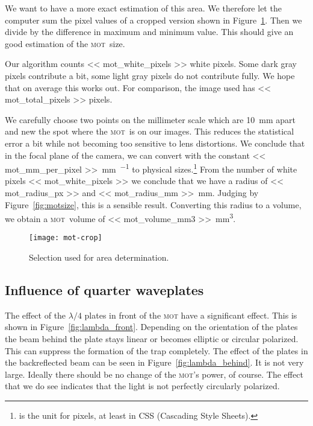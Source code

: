 \documentclass[11pt, english, fleqn, DIV=15, headinclude, BCOR=2cm]{scrreprt}
\newcommand\mot{\textsc{mot}}
\begin{document}
We want to have a more exact estimation of this area. We therefore let the
computer sum the pixel values of a cropped version shown in
Figure~\ref{fig:mot-crop}. Then we divide by the difference in maximum and
minimum value. This should give an good estimation of the \mot\ size.

Our algorithm counts \num{<< mot_white_pixels >>} white pixels. Some dark gray
pixels contribute a bit, some light gray pixels do not contribute fully. We
hope that on average this works out. For comparison, the image used has \num{<<
mot_total_pixels >>} pixels.

We carefully choose two points on the millimeter scale which are
\SI{10}{\milli\meter} apart and new the spot where the \mot\ is on our images.
This reduces the statistical error a bit while not becoming too sensitive to
lens distortions. We conclude that in the focal plane of the camera, we can
convert with the constant \SI{<< mot_mm_per_pixel >>}{\milli\meter\per\pixel}
to physical sizes.\footnote{\si{\pixel} is the unit for pixels, at least in CSS
(Cascading Style Sheets).} From the number of white pixels \num{<<
mot_white_pixels >>} we conclude that we have a radius of \SI{<< mot_radius_px
>>}{\pixel} and \SI{<< mot_radius_mm >>}{\milli\meter}. Judging by
Figure~\ref{fig:motsize}, this is a sensible result. Converting this radius to
a volume, we obtain a \mot\ volume of \SI{<< mot_volume_mm3
>>}{\milli\meter\cubed}.


\begin{figure}
    \centering
    \texttt{[image: mot-crop]}
    \caption{%
        Selection used for area determination.
    }
    \label{fig:mot-crop}
\end{figure}

\subsection{Influence of quarter waveplates}

The effect of the $\lambda/4$ plates in front of the \mot{} have a significant
effect. This is shown in Figure~\ref{fig:lambda_front}. Depending on the
orientation of the plates the beam behind the plate stays linear or becomes
elliptic or circular polarized. This can suppress the formation of the
trap completely. The effect of the plates in the
backreflected beam can be seen in Figure~\ref{fig:lambda_behind}. It is not very
large. Ideally there should be no change of the \mot's power, of course. The
effect that we do see indicates that the light is not perfectly circularly
polarized.
\end{document}
